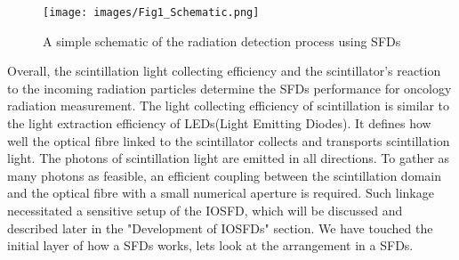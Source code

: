 \documentclass{article}
\begin{document}
\begin{multicols}{2}
\begin{figure}[H]
    \centering
    \texttt{[image: images/Fig1\_Schematic.png]}
    \caption{A simple schematic of the radiation detection process using SFDs}
    \label{fig:1}
\end{figure}

Overall, the scintillation light collecting efficiency and the scintillator's reaction to the incoming radiation particles determine the SFDs performance for oncology radiation measurement. The light collecting efficiency of scintillation is similar to the light extraction efficiency of LEDs(Light Emitting Diodes). It defines how well the optical fibre linked to the scintillator collects and transports scintillation light. The photons of scintillation light are emitted in all directions. To gather as many photons as feasible, an efficient coupling between the scintillation domain and the optical fibre with a small numerical aperture is required. Such linkage necessitated a sensitive setup of the IOSFD, which will be discussed and described later in the "Development of IOSFDs" section. We have touched the initial layer of how a SFDs works, lets look at the arrangement in a SFDs. 


\end{multicols}
\end{document}
